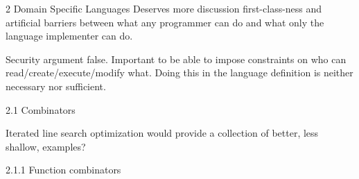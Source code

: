\documentclass[12pt]{PalisadesLakesBook}
\begin{document}
\begin{plSection}{}
\begin{plSection}{2 Domain Specific Languages}
Deserves more discussion first-class-ness and artificial barriers
between what any programmer can do and what only
the language implementer can do.

Security argument false. 
Important to be able to impose constraints on
who can read/create/execute/modify what. 
Doing this in the language definition
is neither necessary nor sufficient.
\begin{plSection}{2.1 Combinators}

Iterated line search optimization would provide 
a collection of better, less shallow, 
examples?

\begin{plSection}{2.1.1 Function combinators}


\end{plSection}
\end{plSection}
\end{plSection}
\end{plSection}
\end{document}

